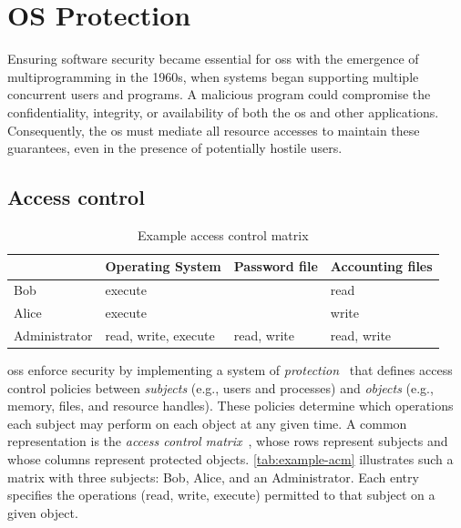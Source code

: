\clearpage

\section{OS Protection}\label{sec:intro:bg-os}


Ensuring software security became essential for \glspl{os} with the emergence of multiprogramming in the 1960s, when systems began supporting multiple concurrent users and programs.
A malicious program could compromise the confidentiality, integrity, or availability of both the \gls{os} and other applications.
Consequently, the \gls{os} must mediate all resource accesses to maintain these guarantees, even in the presence of potentially hostile users.


\subsection{Access control}

\begin{table}[h]
	\begin{center}
		\begin{tabular}[c]{l|lll}
			              & Operating System     & Password file & Accounting files \\
			\midrule
			Bob           & execute              &               & read             \\
			Alice         & execute              &               & write            \\
			Administrator & read, write, execute & read, write   & read, write      \\
		\end{tabular}
		\caption{Example access control matrix}\label{tab:example-acm}
	\end{center}
\end{table}


\glspl{os} enforce security by implementing a system of \emph{protection}~\cite{lampsonprotection} that defines access control policies between \emph{subjects} (e.g., users and processes) and \emph{objects} (e.g., memory, files, and resource handles).
These policies determine which operations each subject may perform on each object at any given time.
A common representation is the \emph{access control matrix}~\cite{lampsonprotection}, whose rows represent subjects and whose columns represent protected objects.
\autoref{tab:example-acm} illustrates such a matrix with three subjects: Bob, Alice, and an Administrator.
Each entry specifies the operations (read, write, execute) permitted to that subject on a given object.


